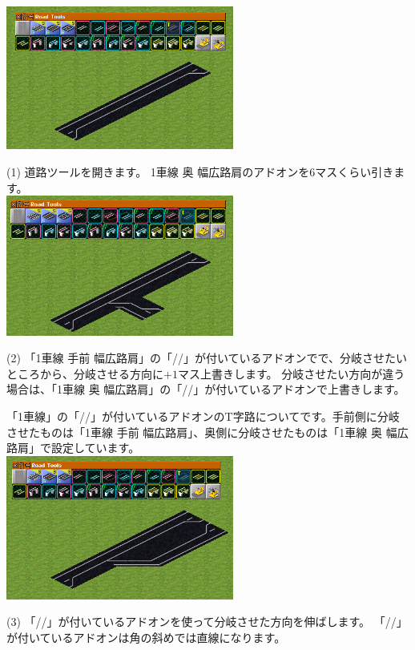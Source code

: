 \documentclass{jarticle}
\begin{document}
\begin{multicols}{2}


\includegraphics[width = 75mm]{picture/20210214-road-3-1.png}

(1)
道路ツールを開きます。
1車線 奥 幅広路肩のアドオンを6マスくらい引きます。\\


\includegraphics[width = 75mm]{picture/20210214-road-3-2.png}

(2)
「1車線 手前 幅広路肩」の「//」が付いているアドオンでで、分岐させたいところから、分岐させる方向に$+1$マス上書きします。
分岐させたい方向が違う場合は、「1車線 奥 幅広路肩」の「//」が付いているアドオンで上書きします。

「1車線」の「//」が付いているアドオンのT字路についてです。手前側に分岐させたものは「1車線 手前 幅広路肩」、奥側に分岐させたものは「1車線 奥 幅広路肩」で設定しています。\\


\includegraphics[width = 75mm]{picture/20210214-road-3-3.png}

(3)
「//」が付いているアドオンを使って分岐させた方向を伸ばします。
「//」が付いているアドオンは角の斜めでは直線になります。\\




\end{multicols}
\end{document}
